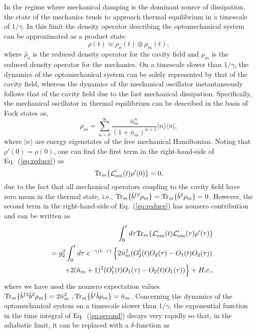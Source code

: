 \documentclass[pra,aps,showpacs,twocolumn,floatfix, superscriptaddress, nofootinbib, nobibnotes]{revtex4-1}
\begin{document}
In the regime where mechanical damping is the dominant source of dissipation, the state of the mechanics tends to approach thermal equilibrium in a timescale of $1/\gamma$. In this limit the density operator describing the optomechanical system can be approximated as a product state
\begin{equation}
\rho(t) \approx \rho_o(t) \otimes \rho_m(t),
\end{equation}
where $\hat \rho_o$ is the reduced density operator for the cavity field and $\hat \rho_m$ is the reduced density operator for the mechanics. On a timescale slower than $1/\gamma$, the dynamics of the optomechanical system can be solely represented by that of the cavity field, whereas the dynamics of the mechanical oscillator instantaneously follows that of the cavity field due to the fast mechanical dissipation. Specifically, the mechanical oscillator in thermal equilibrium can be described in the basis of Fock states as, 
\begin{equation}
 \rho_m =\sum_{n=0}^{\infty}\frac{\bar n_m^n}{(1+\bar n_m)^{n+1}}|n\rangle\langle n |, 
 \label{eq:mechanical_density}
\end{equation} 
where $| n\rangle$ are energy eigenstates of the free mechanical Hamiltonian. 
Noting that $\rho'(0)=\rho(0)$, one can find the first term in the right-hand-side of Eq.~(\ref{eq:reduce}) as
\begin{equation}
 {\rm Tr}_m\{{{\cal L}_{om}'}(t)\rho'(0)\}=0,
\end{equation}
due to the fact that all mechanical operators coupling to the cavity field have zero mean in the thermal state, i.e., ${\rm Tr}_m\{\hat b^{\dag2}\rho_m\}={\rm Tr}_m\{\hat b^2\rho_m\}=0$. However, the second term in the right-hand-side of Eq.~(\ref{eq:reduce}) has nonzero contribution and can be written as
  \begin{eqnarray}
 &&\int_0^{t}d\tau  {\rm Tr}_m\{{{\cal L}_{om}'}(t){{\cal L}_{om}'}(\tau)\rho'(\tau)\} \nonumber \\
 &&=g_2^2\int_0^{t}d\tau~e^{-\gamma(t-\tau)}\left\{2\bar n_m^2(O_2^\dag(t)O_2(\tau)-O_1(t)O_2(\tau))\right. \nonumber \\
 &&\left.+2(\bar n_m+1)^2(O_1^\dag(t)O_1(\tau)-O_2(t)O_1(\tau))\right\}+H.c.,
 \label{eq:second}
\end{eqnarray}
where we have used the nonzero expectation values ${\rm Tr}_m\{\hat b^{\dag2}\hat b^2\rho_m\}=2\bar n_m^2~, {\rm Tr}_m\{\hat b^{\dag}\hat b\rho_m\}=\bar n_m$. Concerning the dynamics of the optomechanical system on a timescale slower than $1/\gamma$, the exponential function in the time integral of Eq.~(\ref{eq:second}) decays very rapidly so that, in the adiabatic limit, it can be replaced with a $\delta$-function as
\end{document}
